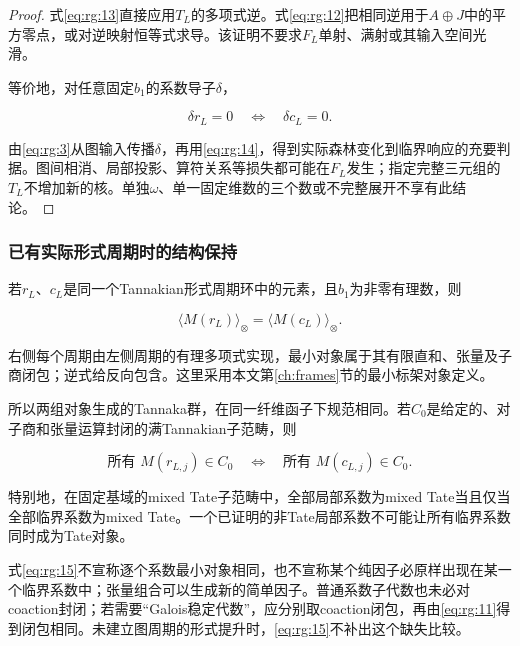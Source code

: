 \documentclass[11pt,a4paper,oneside]{ctexart}
\theoremstyle{cnplain}
\theoremstyle{definition}
\theoremstyle{remark}
\numberwithin{equation}{section}
\begin{document}
\begin{proof}

式\eqref{eq:rg:13}直接应用\(T_L\)的多项式逆。式\eqref{eq:rg:12}把相同逆用于\(A\oplus J\)中的平方零点，或对逆映射恒等式求导。该证明不要求\(F_L\)单射、满射或其输入空间光滑。

等价地，对任意固定\(b_1\)的系数导子\(\delta\)，

\begin{equation}
\delta r_L=0\quad\Longleftrightarrow\quad\delta c_L=0. \label{eq:rg:14}
\end{equation}

由\eqref{eq:rg:3}从图输入传播\(\delta\)，再用\eqref{eq:rg:14}，得到实际森林变化到临界响应的充要判据。图间相消、局部投影、算符关系等损失都可能在\(F_L\)发生；指定完整三元组的\(T_L\)不增加新的核。单独\(\omega\)、单一固定维数的三个数或不完整展开不享有此结论。

\end{proof}

\subsubsection{已有实际形式周期时的结构保持}\label{sec:rg:5.2}

若\(r_L\)、\(c_L\)是同一个Tannakian形式周期环中的元素，且\(b_1\)为非零有理数，则

\begin{equation}
\langle M(r_L)\rangle_\otimes
       =\langle M(c_L)\rangle_\otimes.              \label{eq:rg:15}
\end{equation}

右侧每个周期由左侧周期的有理多项式实现，最小对象属于其有限直和、张量及子商闭包；逆式给反向包含。这里采用本文第\ref{ch:frames}节的最小标架对象定义。

所以两组对象生成的Tannaka群，在同一纤维函子下规范相同。若\(C_0\)是给定的、对子商和张量运算封闭的满Tannakian子范畴，则

\begin{equation}
\text{所有 }M(r_{L,j})\in C_0
 \quad\Longleftrightarrow\quad
 \text{所有 }M(c_{L,j})\in C_0.                    \label{eq:rg:16}
\end{equation}

特别地，在固定基域的mixed Tate子范畴中，全部局部系数为mixed Tate当且仅当全部临界系数为mixed Tate。一个已证明的非Tate局部系数不可能让所有临界系数同时成为Tate对象。

式\eqref{eq:rg:15}不宣称逐个系数最小对象相同，也不宣称某个纯因子必原样出现在某一个临界系数中；张量组合可以生成新的简单因子。普通系数子代数也未必对coaction封闭；若需要``Galois稳定代数''，应分别取coaction闭包，再由\eqref{eq:rg:11}得到闭包相同。未建立图周期的形式提升时，\eqref{eq:rg:15}不补出这个缺失比较。
\end{document}
